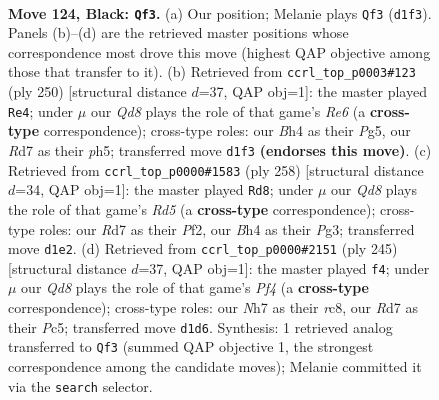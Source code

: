 \documentclass[11pt]{article}
\begin{document}
\clearpage

\begin{figure}[p]\centering
\begin{subfigure}{0.46\textwidth}\centering
\resizebox{\linewidth}{!}{%
\newchessgame
\chessboard[
  setfen={1R6/3r3n/8/4p2p/7b/8/1K4k1/3q4 b - - 1 124},
  showmover=false,
  pgfstyle=straightmove, color=movearrow, markmove={d1-f3}
]}
\caption{}
\end{subfigure}\hfill
\begin{subfigure}{0.46\textwidth}\centering
\resizebox{\linewidth}{!}{%
\newchessgame
\chessboard[
  setfen={8/r5k1/4R3/6Pp/7P/4K3/8/8 w - - 57 126},
  showmover=false,
  pgfstyle=straightmove, color=movearrow, markmove={e6-e4}
]}
\caption{}
\end{subfigure}
\\[4pt]
\begin{subfigure}{0.46\textwidth}\centering
\resizebox{\linewidth}{!}{%
\newchessgame
\chessboard[
  setfen={8/8/r6k/3R4/6p1/3K2P1/5P2/8 w - - 61 130},
  showmover=false,
  pgfstyle=straightmove, color=movearrow, markmove={d5-d8}
]}
\caption{}
\end{subfigure}\hfill
\begin{subfigure}{0.46\textwidth}\centering
\resizebox{\linewidth}{!}{%
\newchessgame
\chessboard[
  setfen={2R5/5k2/7B/2p1pp2/2r5/7K/5P2/8 b - - 1 123},
  showmover=false,
  pgfstyle=straightmove, color=movearrow, markmove={f5-f4}
]}
\caption{}
\end{subfigure}
\caption{\textbf{Move 124, Black: \texttt{Qf3}.} (a) Our position; Melanie plays \texttt{Qf3} (\texttt{d1f3}). Panels (b)--(d) are the retrieved master positions whose correspondence most drove this move (highest QAP objective among those that transfer to it). (b) Retrieved from \texttt{ccrl\_top\_p0003\#123} (ply 250) [structural distance $d$=37, QAP obj=1]: the master played \texttt{Re4}; under $\mu$ our \emph{Qd8} plays the role of that game's \emph{Re6} (a \textbf{cross-type} correspondence); cross-type roles: our \emph{B}h4 as their \emph{P}g5, our \emph{R}d7 as their \emph{p}h5; transferred move \texttt{d1f3} \textbf{(endorses this move)}. (c) Retrieved from \texttt{ccrl\_top\_p0000\#1583} (ply 258) [structural distance $d$=34, QAP obj=1]: the master played \texttt{Rd8}; under $\mu$ our \emph{Qd8} plays the role of that game's \emph{Rd5} (a \textbf{cross-type} correspondence); cross-type roles: our \emph{R}d7 as their \emph{P}f2, our \emph{B}h4 as their \emph{P}g3; transferred move \texttt{d1e2}. (d) Retrieved from \texttt{ccrl\_top\_p0000\#2151} (ply 245) [structural distance $d$=37, QAP obj=1]: the master played \texttt{f4}; under $\mu$ our \emph{Qd8} plays the role of that game's \emph{Pf4} (a \textbf{cross-type} correspondence); cross-type roles: our \emph{N}h7 as their \emph{r}c8, our \emph{R}d7 as their \emph{P}c5; transferred move \texttt{d1d6}. Synthesis: 1 retrieved analog transferred to \texttt{Qf3} (summed QAP objective 1, the strongest correspondence among the candidate moves); Melanie committed it via the \texttt{search} selector.}
\label{fig:thought-m247}
\end{figure}
\end{document}
